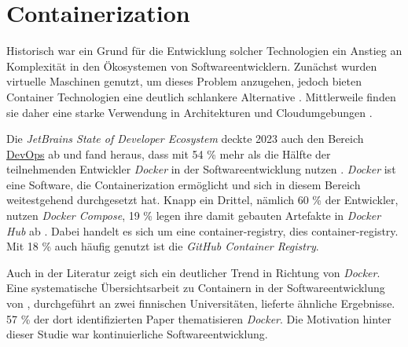 \section{Containerization}
\label{sec:02-03_containerization}

 \cite{023:Setting-up-CI-CD-Pipeline-in-the-Cloud-for-Web-Application}

Historisch war ein Grund für die Entwicklung solcher Technologien ein Anstieg an Komplexität in den Ökosystemen von Softwareentwicklern. Zunächst wurden virtuelle Maschinen genutzt, um dieses Problem anzugehen, jedoch bieten Container Technologien eine deutlich schlankere Alternative \cite{014:Managing-Container-based-Software-Development-Environments}. Mittlerweile finden sie daher eine starke Verwendung in  Architekturen \cite{014:Managing-Container-based-Software-Development-Environments} und Cloudumgebungen \cite{025:Exploring-Solutions-for-Container-Image-Security}.

Die \textit{JetBrains State of Developer Ecosystem} deckte 2023 auch den Bereich \hyperref[sec:03-01_introduction-to-devops]{DevOps} ab und fand heraus, dass mit 54 \% mehr als die Hälfte der teilnehmenden Entwickler \textit{Docker} in der Softwareentwicklung nutzen \cite{207:Developer-Ecosystem}. \textit{Docker} ist eine Software, die Containerization ermöglicht und sich in diesem Bereich weitestgehend durchgesetzt hat. Knapp ein Drittel, nämlich 60 \% der Entwickler, nutzen \textit{Docker Compose}, 19 \% legen ihre damit gebauten Artefakte in \textit{Docker Hub} ab \cite{207:Developer-Ecosystem}. Dabei handelt es sich um eine \Gls{container-registry}, dies \glsdesc{container-registry}. Mit 18 \% auch häufig genutzt ist die \textit{GitHub Container Registry}.

Auch in der Literatur zeigt sich ein deutlicher Trend in Richtung von \textit{Docker}. Eine systematische Übersichtsarbeit zu Containern in der Softwareentwicklung von \citeauthor{015:Containers-in-Software-Development}, durchgeführt an zwei finnischen Universitäten, lieferte ähnliche Ergebnisse. 57 \% der dort identifizierten Paper thematisieren \textit{Docker}. Die Motivation hinter dieser Studie war kontinuierliche Softwareentwicklung. \cite{015:Containers-in-Software-Development}

